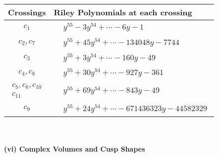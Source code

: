 \documentclass[1p]{elsarticle_modified}
\theoremstyle{definition}
\begin{document}
\begin{tabular}{m{50pt}|m{274pt}}
Crossings & \hspace{64pt}Riley Polynomials at each crossing \\
\hline $$\begin{aligned}c_{1}\end{aligned}$$&$\begin{aligned}
&y^{55}-3 y^{54}+\cdots-6 y-1
\end{aligned}$\\
\hline $$\begin{aligned}c_{2},c_{7}\end{aligned}$$&$\begin{aligned}
&y^{55}+45 y^{54}+\cdots-134048 y-7744
\end{aligned}$\\
\hline $$\begin{aligned}c_{3}\end{aligned}$$&$\begin{aligned}
&y^{55}+3 y^{54}+\cdots-160 y-49
\end{aligned}$\\
\hline $$\begin{aligned}c_{4},c_{8}\end{aligned}$$&$\begin{aligned}
&y^{55}+30 y^{54}+\cdots-927 y-361
\end{aligned}$\\
\hline $$\begin{aligned}c_{5},c_{6},c_{10}\\c_{11}\end{aligned}$$&$\begin{aligned}
&y^{55}+69 y^{54}+\cdots-843 y-49
\end{aligned}$\\
\hline $$\begin{aligned}c_{9}\end{aligned}$$&$\begin{aligned}
&y^{55}+24 y^{54}+\cdots-671436323 y-44582329
\end{aligned}$\\
\hline
\end{tabular}\\~\\
\newpage\flushleft \textbf{(vi) Complex Volumes and Cusp Shapes}
\end{document}

